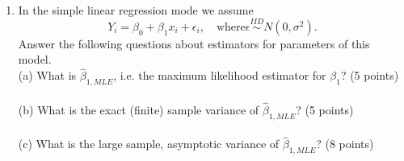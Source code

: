 \documentclass[12pt]{article}
\begin{document}
\begin{enumerate}[leftmargin=\labelsep]
(a) What is the likelihood for $\nu_1$? (5 points)\\
\vspace{3in}\\
(b) Let $W = \frac{U/\nu_1}{V/\nu_2}$. What is the likelihood for $(\nu_1, \nu_2)$ given  $W = w_{obs}$? (5 points)\\
\pagebreak 

\item In the simple linear regression mode we assume $$Y_i = \beta_0 + \beta_1 x_i + \epsilon_i, \quad \text{where} \epsilon \stackrel{IID}{\sim} N(0, \sigma^2).$$
Answer the following questions about estimators for parameters of this model.\\

(a) What is $\hat{\beta}_{1, MLE}$, i.e. the maximum likelihood estimator for $\beta_1$? (5 points)\\
\vspace{3in}\\
(b) What is the exact (finite) sample variance of $\hat{\beta}_{1, MLE}$? (5 points)\\
\vspace{3in}\\
(c) What is the large sample, asymptotic variance of $\hat{\beta}_{1, MLE}$? (8 points)\\

\end{enumerate}
\end{document}
